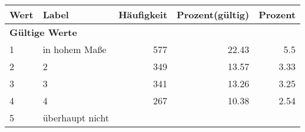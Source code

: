      \begin{longtable}{lXrrr}
     \toprule
     \textbf{Wert} & \textbf{Label} & \textbf{Häufigkeit} & \textbf{Prozent(gültig)} & \textbf{Prozent} \\
     \endhead
     \midrule
     \multicolumn{5}{l}{\textbf{Gültige Werte}}\\

     1 &
     \multicolumn{1}{X}{ in hohem Maße   } &


       \num{577} &
       \num[round-mode=places,round-precision=2]{22.43} &
         \num[round-mode=places,round-precision=2]{5.5} \\

     2 &
     \multicolumn{1}{X}{ 2   } &


       \num{349} &
       \num[round-mode=places,round-precision=2]{13.57} &
         \num[round-mode=places,round-precision=2]{3.33} \\

     3 &
     \multicolumn{1}{X}{ 3   } &


       \num{341} &
       \num[round-mode=places,round-precision=2]{13.26} &
         \num[round-mode=places,round-precision=2]{3.25} \\

     4 &
     \multicolumn{1}{X}{ 4   } &


       \num{267} &
       \num[round-mode=places,round-precision=2]{10.38} &
         \num[round-mode=places,round-precision=2]{2.54} \\

     5 &
     \multicolumn{1}{X}{ überhaupt nicht   } &



\end{longtable}
